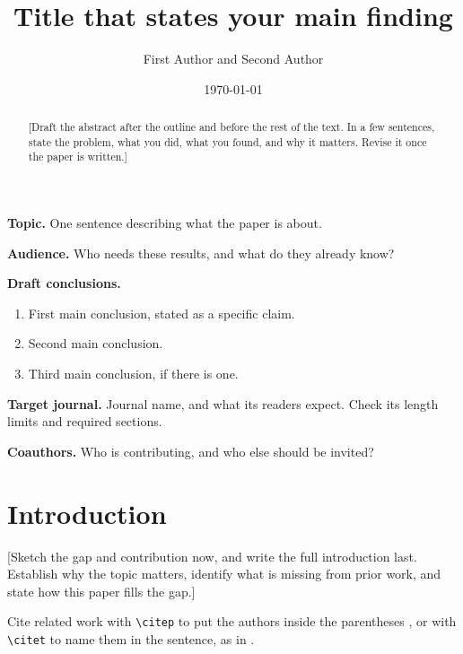 \documentclass[11pt]{article}
\title{Title that states your main finding}
\author{First Author and Second Author}
\date{\today}  %
\newcommand{\todo}[1]{\textcolor{todocolor}{[#1]}}
\newcommand{\todo}[1]{}
\begin{document}
\maketitle

\ifdraft
\begin{tcolorbox}[colback=todocolor!4, colframe=todocolor, coltext=todocolor,
  title=Plan (hidden when \texttt{\textbackslash draftfalse})]
\textbf{Topic.} One sentence describing what the paper is about.

\medskip
\textbf{Audience.} Who needs these results, and what do they already know?

\medskip
\textbf{Draft conclusions.}
\begin{enumerate}
  \item First main conclusion, stated as a specific claim.
  \item Second main conclusion.
  \item Third main conclusion, if there is one.
\end{enumerate}

\textbf{Target journal.} Journal name, and what its readers expect. Check its length limits and required sections.

\medskip
\textbf{Coauthors.} Who is contributing, and who else should be invited?
\end{tcolorbox}
\fi

\begin{abstract}
\todo{Draft the abstract after the outline and before the rest of the text. In a few sentences, state the problem, what you did, what you found, and why it matters. Revise it once the paper is written.}
\end{abstract}


\section{Introduction}

\todo{Sketch the gap and contribution now, and write the full introduction last. Establish why the topic matters, identify what is missing from prior work, and state how this paper fills the gap.}

Cite related work with \texttt{\textbackslash citep} to put the authors inside the parentheses \citep{swales_1990}, or with \texttt{\textbackslash citet} to name them in the sentence, as in \citet{gastel_2022}.
\end{document}

